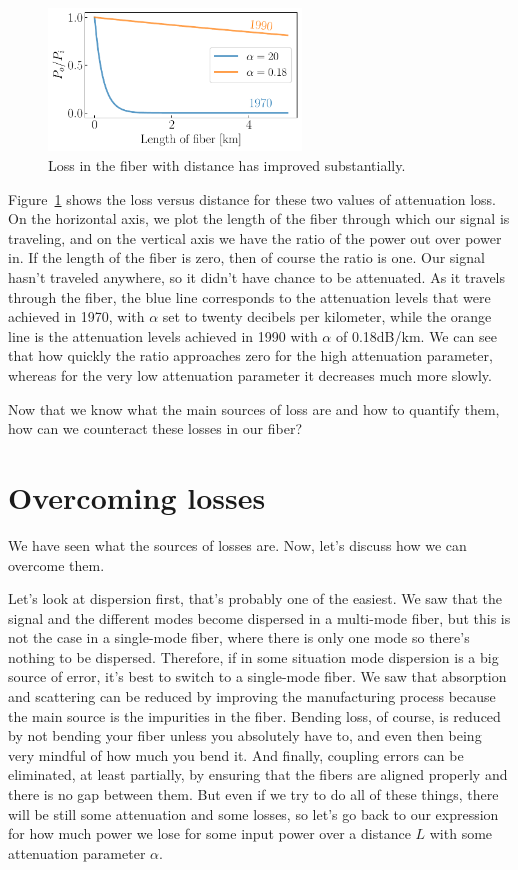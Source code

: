 \begin{figure}
    \centering
    \includegraphics[width=0.6\textwidth]{lesson11/11-3_attenuation_dB.pdf}
    \caption[Power loss in fiber]{Loss in the fiber with distance has improved substantially.}
    \label{fig:11-3_attenuation_dB}
\end{figure}
Figure~\ref{fig:11-3_attenuation_dB} shows the loss versus distance for these two values of attenuation loss. On the horizontal axis, we plot the length of the fiber through which our signal is traveling, and on the vertical axis we have the ratio of the power out over power in. If the length of the fiber is zero, then of course the ratio is one. Our signal hasn't traveled anywhere, so it didn't have chance to be attenuated. As it travels through the fiber, the blue line corresponds to the attenuation levels that were achieved in 1970, with $\alpha$ set to twenty decibels per kilometer, while the orange line is the attenuation levels achieved  in 1990 with $\alpha$ of 0.18dB/km. We can see that how quickly the ratio approaches zero for the high attenuation parameter, whereas for the very low attenuation parameter it decreases much more slowly.

Now that we know what the main sources of loss are and how to quantify them, how can we counteract these losses in our fiber?

\section{Overcoming losses}
\label{sec:11-4_overcoming_losses}

We have seen what the sources of losses are. Now, let's discuss how we can overcome them.

Let's look at dispersion first, that's probably one of the easiest. We saw that the signal and the different modes become dispersed in a multi-mode fiber, but this is not the case in a single-mode fiber, where there is only one mode so there's nothing to be dispersed. Therefore, if in some situation mode dispersion is a big source of error, it's best to switch to a single-mode fiber. We saw that absorption and scattering can be reduced by improving the manufacturing process because the main source is the impurities in the fiber. Bending loss, of course, is reduced by not bending your fiber unless you absolutely have to, and even then being very mindful of how much you bend it. And finally, coupling errors can be eliminated, at least partially, by ensuring that the fibers are aligned properly and there is no gap between them. But even if we try to do all of these things, there will be still some attenuation and some losses, so let's go back to our expression for how much power we lose for some input power over a distance $L$ with some attenuation parameter $\alpha$.

